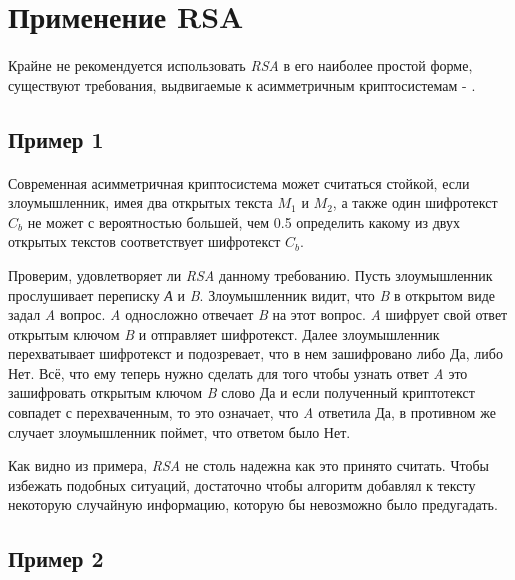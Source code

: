
\section{Применение RSA}

\paragraph{} Крайне не рекомендуется использовать \textit{RSA} в его наиболее простой форме, существуют требования, выдвигаемые к асимметричным криптосистемам
- \cite[страницы 329-331]{may10}.

\subsection{Пример 1}

\paragraph{} Современная асимметричная криптосистема может считаться стойкой, если злоумышленник, имея два открытых текста {$M_1$} и 
  {$M_2$}, а также один шифротекст {$C_b$} не может с вероятностью большей, чем 0.5 определить какому из двух 
  открытых текстов соответствует шифротекст {$C_b$}.

  Проверим, удовлетворяет ли \textit{RSA} данному требованию. Пусть злоумышленник прослушивает переписку \textit{А} и \textit{B}. Злоумышленник видит, что 
  \textit{B} в открытом виде задал \textit{A} вопрос. \textit{A} односложно отвечает \textit{B} на этот вопрос. \textit{A} шифрует свой ответ открытым ключом
  \textit{B} и отправляет шифротекст. Далее злоумышленник перехватывает шифротекст и подозревает, что в нем зашифровано либо Да, либо Нет. Всё, что ему 
  теперь нужно сделать для того чтобы узнать ответ \textit{A} это зашифровать открытым ключом \textit{B} слово Да и если полученный криптотекст совпадет 
  с перехваченным, то это означает, что \textit{A} ответила Да, в противном же случает злоумышленник поймет, что ответом было Нет.

  Как видно из примера, \textit{RSA} не столь надежна как это принято считать. Чтобы избежать подобных ситуаций, достаточно чтобы алгоритм добавлял к 
  тексту некоторую случайную информацию, которую бы невозможно было предугадать. 

\subsection{Пример 2}

